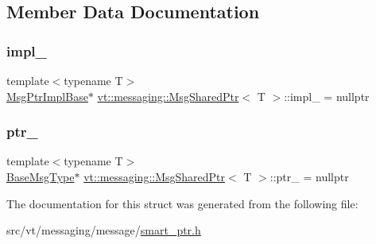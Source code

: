 \subsection{Member Data Documentation}
\mbox{\label{structvt_1_1messaging_1_1_msg_shared_ptr_aa0cf96203c13d77d691888c852bc333e}} 
\subsubsection{\texorpdfstring{impl\+\_\+}{impl\_}}
{\footnotesize\ttfamily template$<$typename T$>$ \\
\hyperlink{structvt_1_1messaging_1_1_msg_ptr_impl_base}{Msg\+Ptr\+Impl\+Base}$\ast$ \hyperlink{structvt_1_1messaging_1_1_msg_shared_ptr}{vt\+::messaging\+::\+Msg\+Shared\+Ptr}$<$ T $>$\+::impl\+\_\+ = nullptr\hspace{0.3cm}{\ttfamily [private]}}

\mbox{\label{structvt_1_1messaging_1_1_msg_shared_ptr_aac5218a8b39004946a523ac4a729a3da}} 
\subsubsection{\texorpdfstring{ptr\+\_\+}{ptr\_}}
{\footnotesize\ttfamily template$<$typename T$>$ \\
\hyperlink{structvt_1_1messaging_1_1_msg_shared_ptr_a778cb9ec8919e4a309d28ed345ac318d}{Base\+Msg\+Type}$\ast$ \hyperlink{structvt_1_1messaging_1_1_msg_shared_ptr}{vt\+::messaging\+::\+Msg\+Shared\+Ptr}$<$ T $>$\+::ptr\+\_\+ = nullptr\hspace{0.3cm}{\ttfamily [private]}}



The documentation for this struct was generated from the following file\+:\begin{DoxyCompactItemize}
\item 
src/vt/messaging/message/\hyperlink{smart__ptr_8h}{smart\+\_\+ptr.\+h}\end{DoxyCompactItemize}
